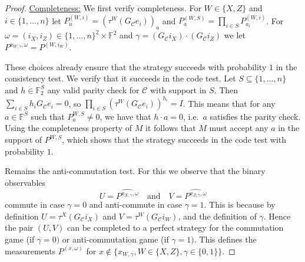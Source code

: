 \documentclass[11pt]{article}
\theoremstyle{definition}
\newcommand{\code}{\mathcal{C}}
\newcommand{\Id}{\ensuremath{I}}
\newcommand{\field}{\mathbb{F}}
\newcommand{\F}{\ensuremath{\mathbb{F}}}
\begin{document}
\begin{proof}
\underline{Completeness:} We first verify completeness. For $W\in\{X,Z\}$ and $i\in\{1,\ldots,n\}$ let $P^{(W,i)}_a = (\tau^W(G_\code e_i))_a$ and $P^{(W,S)}_a = \prod_{i\in S} P^{(W,i)}_{a_i}$. For $\omega=(i_X,i_Z)\in \{1,\ldots,n\}^2 \times \field^2$ and $\gamma =(G_\code i_X) \cdot(G_\code {i_Z}) $ we let $P^{x_{W,\gamma},\omega} = P^{(W,i_W)}$. 

These choices already ensure that the strategy succeeds with probability $1$ in the consistency test. We verify that it succeeds in the code test. Let $S\subseteq\{1,\ldots,n\}$ and $h\in \F_2^S$ any valid parity check for $\code$ with support in $S$. Then $\sum_{i\in S} h_i G_\code e_i = 0$, so $\prod_{i\in S}(\tau^W(G_\code e_i))^{h_i}=\Id$. This means that for any $a\in\field^S$ such that $P^{W,S}_a\neq 0$, we have that $h\cdot a =0$, i.e.\ $a$ satisfies the parity check. Using the completeness property of $M$ it follows that $M$ must accept any $a$ in the support of $P^{W,S}$, which shows that the strategy succeeds in the code test with probability $1$. 

Remains the anti-commutation test. For this we observe that 
the binary observables 
\[ U=\widehat{ P^{x_{X,\gamma},\omega}} \quad\text{and}\quad V= \widehat{P^{x_{Z,\gamma},\omega} } \]
commute in case $\gamma=0$ and anti-commute in case $\gamma=1$. This is because by definition $U=\tau^X(G_\code i_X)$ and $V=\tau^W(G_\code i_W)$, and the definition of $\gamma$. Hence the pair $(U,V)$ can be completed to a perfect strategy for the commutation game (if $\gamma=0)$ or anti-commutation game (if $\gamma=1)$. This defines the measurements $P^{(x,\omega)}$ for $x\notin \{x_{W,\gamma},W\in\{X,Z\},\gamma\in\{0,1\}\}$. 

\bigskip 


\end{proof}
\end{document}
